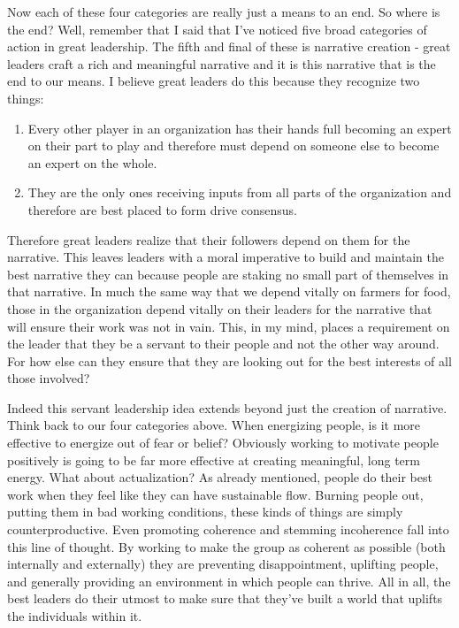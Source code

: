 \documentclass[10pt,a5paper]{book}
\begin{document}
Now each of these four categories are really just a means to an end. So where is the end? Well, remember that I said that I've noticed five broad categories of action in great leadership. The fifth and final of these is narrative creation - great leaders craft a rich and meaningful narrative and it is this narrative that is the end to our means. I believe great leaders do this because they recognize two things:
\begin{enumerate}
\item Every other player in an organization has their hands full becoming an expert on their part to play and therefore must depend on someone else to become an expert on the whole.
\item They are the only ones receiving inputs from all parts of the organization and therefore are best placed to form drive consensus.
\end{enumerate}

Therefore great leaders realize that their followers depend on them for the narrative. This leaves leaders with a moral imperative to build and maintain the best narrative they can because people are staking no small part of themselves in that narrative. In much the same way that we depend vitally on farmers for food, those in the organization depend vitally on their leaders for the narrative that will ensure their work was not in vain. This, in my mind, places a requirement on the leader that they be a servant to their people and not the other way around. For how else can they ensure that they are looking out for the best interests of all those involved?

Indeed this servant leadership idea extends beyond just the creation of narrative. Think back to our four categories above. When energizing people, is it more effective to energize out of fear or belief? Obviously working to motivate people positively is going to be far more effective at creating meaningful, long term energy. What about actualization? As already mentioned, people do their best work when they feel like they can have sustainable flow. Burning people out, putting them in bad working conditions, these kinds of things are simply counterproductive. Even promoting coherence and stemming incoherence fall into this line of thought. By working to make the group as coherent as possible (both internally and externally) they are preventing disappointment, uplifting people, and generally providing an environment in which people can thrive. All in all, the best leaders do their utmost to make sure that they've built a world that uplifts the individuals within it. 
\end{document}
